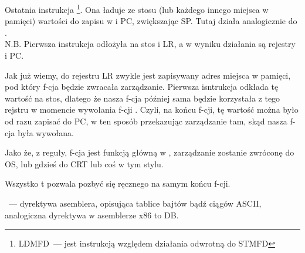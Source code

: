 Ostatnia instrukcja \footnote{\ac{LDMFD}~--- jest instrukcją względem działania odwrotną do \ac{STMFD}}.
Ona ładuje ze stosu (lub każdego innego miejsca w pamięci) wartości do zapisu w  i \ac{PC}, zwiększając  \ac{SP}.
Tutaj działa analogicznie do \POP.\\
N.B. Pierwsza instrukcja  odłożyła na stos  i \ac{LR}, a  w wyniku działania  są rejestry  i \ac{PC}.

Jak już wiemy, do rejestru \ac{LR} zwykle jest zapisywany adres miejsca w pamięci, pod który f-cja będzie zwracała zarządzanie.
Pierwsza isntrukcja odkłada tę wartość na stos, dlatego że nasza f-cja \main później sama będzie korzystała z tego rejstru w momencie wywołania f-cji \printf.
Czyli, na końcu f-cji, tę wartość można było od razu zapisać do \ac{PC}, w ten sposób przekazując zarządzanie tam, skąd nasza f-cja była wywołana.

Jako że, z reguły, f-cja \main jest funkcją główną w \CCpp, zarządzanie zostanie zwróconę do \ac{OS}, lub gdzieś do \ac{CRT} 
lub coś w tym stylu.

Wszystko t pozwala pozbyć się ręcznego  na samym końcu f-cji.

~--- dyrektywa asemblera, opisująca tablice bajtów bądź ciągów ASCII, analogiczna dyrektywa w asemblerze x86 to DB.



